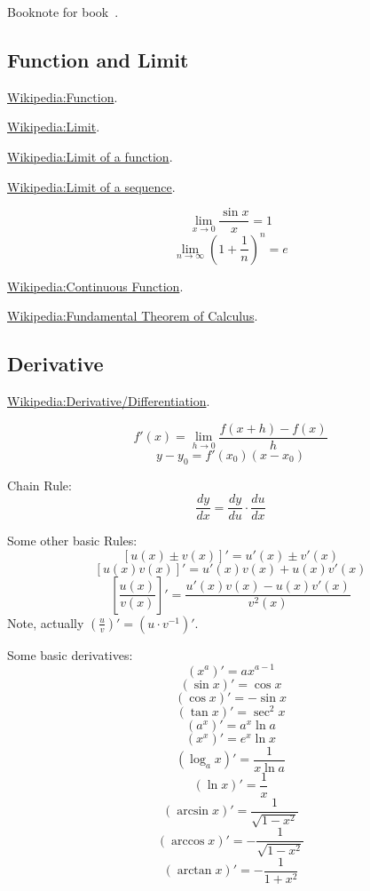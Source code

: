 
Booknote for book~\cite{bib:calc1}.

\subsection{Function and Limit}

 \href{https://simple.wikipedia.org/wiki/Function_(mathematics)}
 {Wikipedia:Function}.

 \href{https://en.wikipedia.org/wiki/Limit_(mathematics)}
 {Wikipedia:Limit}.

 \href{https://en.wikipedia.org/wiki/Limit_of_a_function}
 {Wikipedia:Limit of a function}.

 \href{https://en.wikipedia.org/wiki/Limit_of_a_sequence}
 {Wikipedia:Limit of a sequence}.

 $$ \lim\limits_{x\rightarrow 0} \frac{\sin x}{x} = 1 $$
 $$ \lim\limits_{n\rightarrow \infty} (1 + \frac{1}{n})^n = e $$

 \href{https://en.wikipedia.org/wiki/Continuous_function}
 {Wikipedia:Continuous Function}.

 \href{https://en.wikipedia.org/wiki/Fundamental_theorem_of_calculus}
 {Wikipedia:Fundamental Theorem of Calculus}.

\subsection{Derivative}

 \href{https://en.wikipedia.org/wiki/Derivative}
 {Wikipedia:Derivative/Differentiation}.

$$ f'(x) = \lim_{h\rightarrow 0} \frac{f(x+h)-f(x)}{h} $$
$$ y-y_0 = f'(x_0) (x-x_0) $$

 Chain Rule:
 $$ \frac{dy}{dx} = \frac{dy}{du}\cdot \frac{du}{dx} $$

 Some other basic Rules:
 $$ [u(x)\pm v(x)]' = u'(x) \pm v'(x) $$
 $$ [u(x)v(x)]' = u'(x)v(x) + u(x)v'(x) $$
 $$ [\frac{u(x)}{v(x)}]' = \frac{u'(x)v(x) - u(x)v'(x)}{v^2(x)} $$
 Note, actually $(\frac{u}{v})' = (u\cdot v^{-1})'$.

 Some basic derivatives:
 $$(x^a)' = ax^{a-1}$$
 $$(\sin x)' = \cos x$$
 $$(\cos x)' = -\sin x$$
 $$(\tan x)' = \sec^2 x$$
 $$(a^x)' = a^x \ln a$$
 $$(x^x)' = e^x \ln x$$
 $$(\log_a x)' = \frac{1}{x\ln a}$$
 $$(\ln x)' = \frac{1}{x} $$
 $$(\arcsin x)' = \frac{1}{\sqrt{1-x^2}}  $$
 $$(\arccos x)' = - \frac{1}{\sqrt{1-x^2}}  $$
 $$(\arctan x)' = - \frac{1}{1+x^2}  $$

